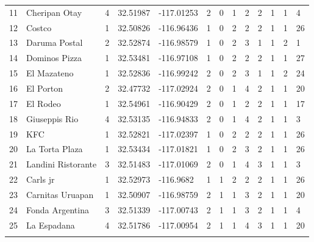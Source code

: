 \begin{table}
\begin{tabular}{lllllllllllll}
11  &   Cheripan Otay   &   4   &   32.51987    &   -117.01253  &   2   &   0   &   1   &   2   &   2   &   1   &   1   &   4   \\
12  &   Costco  &   1   &   32.50826    &   -116.96436  &   1   &   0   &   2   &   2   &   2   &   1   &   1   &   26  \\
13  &   Daruma Postal   &   2   &   32.52874    &   -116.98579  &   1   &   0   &   2   &   3   &   1   &   1   &   2   &   1   \\
14  &   Dominos Pizza   &   1   &   32.53481    &   -116.97108  &   1   &   0   &   2   &   2   &   2   &   1   &   1   &   27  \\
15  &   El Mazateno &   1   &   32.52836    &   -116.99242  &   2   &   0   &   2   &   3   &   1   &   1   &   2   &   24  \\
16  &   El Porton   &   2   &   32.47732    &   -117.02924  &   2   &   0   &   1   &   4   &   2   &   1   &   1   &   20  \\
17  &   El Rodeo    &   1   &   32.54961    &   -116.90429  &   2   &   0   &   1   &   2   &   2   &   1   &   1   &   17  \\
18  &   Giuseppis Rio   &   4   &   32.53135    &   -116.94833  &   2   &   0   &   1   &   4   &   2   &   1   &   1   &   3   \\
19  &   KFC     &   1   &   32.52821    &   -117.02397  &   1   &   0   &   2   &   2   &   2   &   1   &   1   &   26  \\
20  &   La Torta Plaza  &   1   &   32.53434    &   -117.01821  &   1   &   0   &   2   &   3   &   2   &   1   &   1   &   26  \\
21  &   Landini Ristorante  &   3  &   32.51483   &   -117.01069  &   2   &   0   &   1   &   4   &   3   &   1   &   1   &   3   \\
22  &   Carls jr    &   1   &   32.52973    &   -116.9682   &   1   &   1   &   2   &   2   &   2   &   1   &   1   &   26  \\
23  &   Carnitas Uruapan  &   1   &   32.50907  &   -116.98759  &   2   &   1   &   1   &   3   &   2   &   1   &   1   &   20  \\
24  &   Fonda Argentina &   3   &   32.51339    &   -117.00743  &   2   &   1   &   1   &   3   &   2   &   1   &   1   &   4   \\
25  &   La Espadana &   4   &   32.51786    &   -117.00954  &   2   &   1   &   1   &   4   &   3   &   1   &   1   &   20  \\
\noalign{\smallskip}\hline
\end{tabular}
\end{table}

